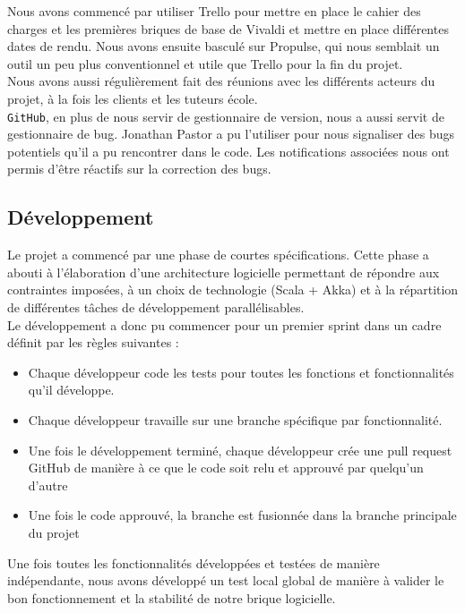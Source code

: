\documentclass[11pt,a4paper]{article}
\begin{document}
Nous avons commencé par utiliser Trello pour mettre en place le cahier des charges et les premières briques de base de Vivaldi et mettre en place différentes dates de rendu. Nous avons ensuite basculé sur Propulse, qui nous semblait un outil un peu plus conventionnel et utile que Trello pour la fin du projet.\\

Nous avons aussi régulièrement fait des réunions avec les différents acteurs du projet, à la fois les clients et les tuteurs école.\\

\texttt{GitHub}, en plus de nous servir de gestionnaire de version, nous a aussi servit de gestionnaire de bug. Jonathan Pastor a pu l'utiliser pour nous signaliser des bugs potentiels qu'il a pu rencontrer dans le code. Les notifications associées nous ont permis d'être réactifs sur la correction des bugs.

\subsection{Développement}
\label{subsec:dev}
Le projet a commencé par une phase de courtes spécifications. Cette phase a abouti à l'élaboration d'une architecture logicielle permettant de répondre aux contraintes imposées, à un choix de technologie (Scala + Akka) et à la répartition de différentes tâches de développement parallélisables. \\

Le développement a donc pu commencer pour un premier sprint dans un cadre définit par les règles suivantes :

\begin{itemize}
\item Chaque développeur code les tests pour toutes les fonctions et fonctionnalités qu'il développe.
\item Chaque développeur travaille sur une branche spécifique par fonctionnalité.
\item Une fois le développement terminé, chaque développeur crée une pull request GitHub de manière à ce que le code soit relu et approuvé par quelqu'un d'autre
\item Une fois le code approuvé, la branche est fusionnée dans la branche principale du projet
\end{itemize}

Une fois toutes les fonctionnalités développées et testées de manière indépendante, nous avons développé un test local global de manière à valider le bon fonctionnement et la stabilité de notre brique logicielle.\\
\end{document}

